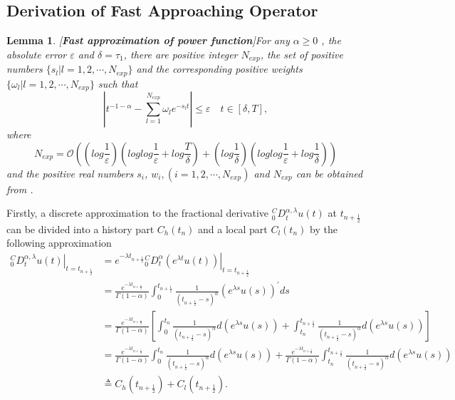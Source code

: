\documentclass[10pt, reqno]{amsart}
\newtheorem{lmm}{\bf Lemma}
\newenvironment{lemma}{\begin{lmm}}{\end{lmm}}
\theoremstyle{remark}
\theoremstyle{definition}
\numberwithin{table}{section}
\begin{document}
\subsection{Derivation of Fast Approaching Operator}
\begin{lemma}\cite{beylkin2005}\label{fast}[\textbf{Fast approximation of power function}]\label{fast}
For any $\alpha \geq 0$ , the absolute error $\varepsilon $ and  $\delta= \tau_1 $,  there are positive integer $N_{exp} $, the set of positive numbers $\{s_l | l = 1,  2,  \cdots,  N_ {exp} \} $ and the corresponding positive weights $\{\omega_l | l = 1, 2, \cdots, N_{exp}\}$ such that
$$|t^{-1-\alpha}-\sum_{l=1}^{N_{exp}}\omega_le^{-s_lt}|\leqslant\varepsilon\quad t\in[\delta, T], $$
where
$$N_{exp}=\mathcal{O}((log\frac1\varepsilon)(loglog\frac1\varepsilon+log\frac  T\delta)+(log\frac1\delta)(loglog\frac1\varepsilon+log\frac1\delta))$$
and the positive real numbers $s_i$,  $w_i, (i = 1,  2,  \cdots ,  N_{exp})$ and $N_{exp}$ can be obtained from \cite{beylkin2005}. 
\end{lemma}

Firstly,  a discrete approximation to the fractional derivative ${ }_0^C D_t^{\alpha,  \lambda} u(t)$ at $t_{n+\frac{1}{2}}$ can be divided into a history part $C_h\left(t_n\right)$ and a local part $C_l\left(t_n\right)$ by the following approximation
\begin{equation}
\begin{aligned}
\left. { }_0^C D_t^{\alpha,  \lambda} u(t)\right|_{t=t_{n+\frac{1}{2}}} & =\left. e^{-\lambda t_{n+\frac{1}{2}}} {}_0^CD_t^\alpha\left(e^{\lambda t} u(t)\right)\right|_{t=t_{n+\frac{1}{2}}} \\
& =\frac{e^{-\lambda t_{n+\frac{1}{2}}}}{\Gamma(1-\alpha)} \int_0^{t_{n+\frac{1}{2}}} \frac{1}{\left(t_{n+\frac{1}{2}}-s\right)^\alpha}\left(e^{\lambda s} u(s)\right)^{\prime} d s \\
& =\frac{e^{-\lambda t_{n+\frac{1}{2}}}}{\Gamma(1-\alpha)}\left[\int_0^{t_{n}} \frac{1}{\left(t_{n+\frac{1}{2}}-s\right)^\alpha} d\left(e^{\lambda s} u(s)\right)+\int_{t_{n}}^{t_{n+\frac{1}{2}}} \frac{1}{\left(t_{n+\frac{1}{2}}-s\right)^\alpha} d\left(e^{\lambda s} u(s)\right)\right] \\
&= \frac{e^{-\lambda t_{n+\frac{1}{2}}}}{\Gamma(1-\alpha)}\int_0^{t_{n}} \frac{1}{\left(t_{n+\frac{1}{2}}-s\right)^\alpha} d\left(e^{\lambda s} u(s)\right)+\frac{e^{-\lambda t_{n+\frac{1}{2}}}}{\Gamma(1-\alpha)}\int_{t_{n}}^{t_{n+\frac{1}{2}}} \frac{1}{\left(t_{n+\frac{1}{2}}-s\right)^\alpha} d\left(e^{\lambda s} u(s)\right)\\
& \triangleq{} C_h\left(t_{n+\frac{1}{2}}\right)+C_l\left(t_{n+\frac{1}{2}}\right) . 
\end{aligned}
\end{equation}
\end{document}
